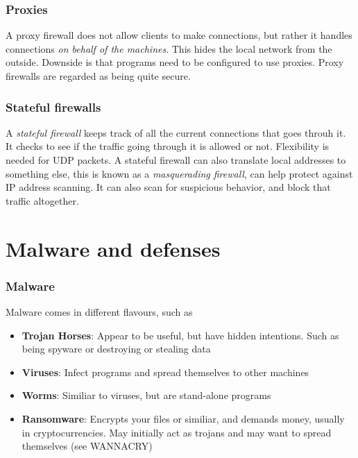
\begin{frame}
    \frametitle{Proxies}
        A proxy firewall does not allow clients to make connections, but rather it handles connections \textit{on behalf of the machines}. This hides the local network from the outside. Downside is that programs need to be configured to use proxies. Proxy firewalls are regarded as being quite secure. 
\end{frame}

\begin{frame}
    \frametitle{Stateful firewalls}
        A \textit{stateful firewall} keeps track of all the current connections that goes throuh it. It checks to see if the traffic going through it is allowed or not. Flexibility is needed for UDP packets. A stateful firewall can also translate local addresses to something else, this is known as a \textit{masquerading firewall}, can help protect against IP address scanning. It can also scan for suspicious behavior, and block that traffic altogether. 
    

\end{frame}

\section{Malware and defenses}
    \begin{frame}
        \frametitle{Malware}
            Malware comes in different flavours, such as 
                \begin{itemize}
                        \item \textbf{Trojan Horses}: Appear to be useful, but have hidden intentions. Such as being spyware or destroying or stealing data
                        \item \textbf{Viruses}: Infect programs and spread themselves to other machines
                        \item \textbf{Worms}: Similiar to viruses, but are stand-alone programs
                        \item \textbf{Ransomware}: Encrypts your files or similiar, and demands money, usually in cryptocurrencies. May initially act as trojans and may want to spread themselves (see WANNACRY)
                \end{itemize}
    \end{frame}

